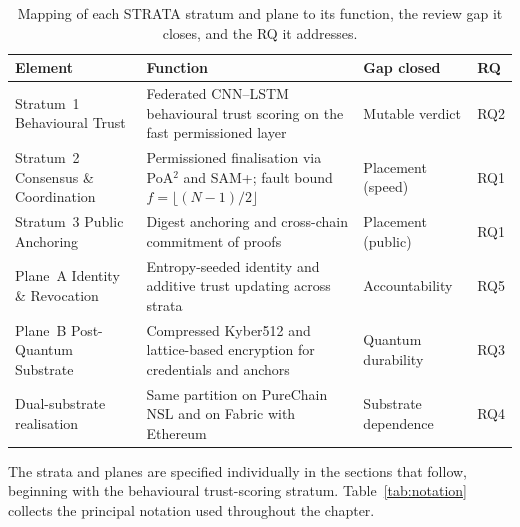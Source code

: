 \begin{table}[!htbp]
  \centering
  \footnotesize
  \setlength{\tabcolsep}{5pt}
  \renewcommand{\arraystretch}{1.3}
  \caption{Mapping of each STRATA stratum and plane to its function, the review gap it closes, and the RQ it addresses.}
  \label{tab:strata-map}
  \begin{tabularx}{\textwidth}{@{}
      >{\raggedright\arraybackslash}p{3.0cm}
      >{\raggedright\arraybackslash}X
      >{\raggedright\arraybackslash}p{2.4cm}
      >{\raggedright\arraybackslash}p{0.9cm}@{}}
    \toprule
    \textbf{Element} & \textbf{Function} & \textbf{Gap closed} & \textbf{RQ} \\
    \midrule
    Stratum~1 \newline Behavioural Trust
      & Federated CNN--LSTM behavioural trust scoring on the fast permissioned layer
      & Mutable verdict & RQ2 \\
    Stratum~2 \newline Consensus \& Coordination
      & Permissioned finalisation via PoA$^2$ and SAM+; fault bound $f=\lfloor(N{-}1)/2\rfloor$
      & Placement (speed) & RQ1 \\
    Stratum~3 \newline Public Anchoring
      & Digest anchoring and cross-chain commitment of proofs
      & Placement (public) & RQ1 \\
    Plane~A \newline Identity \& Revocation
      & Entropy-seeded identity and additive trust updating across strata
      & Accountability & RQ5 \\
    Plane~B \newline Post-Quantum Substrate
      & Compressed Kyber512 and lattice-based encryption for credentials and anchors
      & Quantum durability & RQ3 \\
    \addlinespace
    Dual-substrate realisation
      & Same partition on PureChain NSL and on Fabric with Ethereum
      & Substrate dependence & RQ4 \\
    \bottomrule
  \end{tabularx}
\end{table}

The strata and planes are specified individually in the sections that follow, beginning with the behavioural trust-scoring stratum. Table~\ref{tab:notation} collects the principal notation used throughout the chapter.

